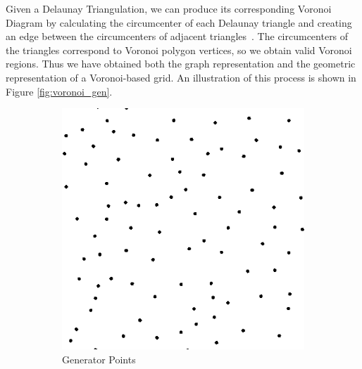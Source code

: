 \documentclass[a4paper,11pt]{article}
\begin{document}
Given a Delaunay Triangulation, we can produce its corresponding Voronoi Diagram by calculating the circumcenter of each Delaunay triangle and creating an edge between the circumcenters of adjacent triangles~\cite{de11,ed08}. The circumcenters of the triangles correspond to Voronoi polygon vertices, so we obtain valid Voronoi regions. Thus we have obtained both the graph representation and the geometric representation of a Voronoi-based grid. An illustration of this process is shown in Figure \ref{fig:voronoi_gen}.

\begin{figure}[htp]
\centering
\begin{subfigure}[t]{0.4\textwidth}
  \centering
  \includegraphics[width=\textwidth]{ch3_figs/stoma_pts_square_edited}
  \caption{Generator Points}
\end{subfigure}
~
\begin{subfigure}[t]{0.4\textwidth}
  \centering

\end{subfigure}
\end{figure}
\end{document}
